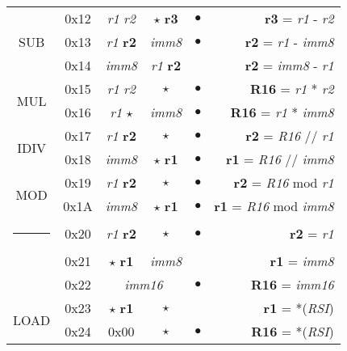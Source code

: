 \documentclass[a4paper,12pt]{article}
\makeatletter
\newcommand{\thickhline}{%
    \noalign {\ifnum 0=`}\fi \hrule height 2pt
    \futurelet \reserved@a \@xhline
}
\makeatother
\begin{document}
\begin{table}[H]
\begin{tabular}{|c|c|c|c|c|r|}
        \hline
        \multirow{3}{*}{SUB} & 0x12 & \textit{r1} \quad \textit{r2}  & $\star$ \quad \textbf{r3} & $\bullet$ & \textbf{r3} = \textit{r1} - \textit{r2}\\
        \cline{2-6}
                             & 0x13 & \textit{r1} \quad \textbf{r2}  & \textit{imm8} & $\bullet$ & \textbf{r2} = \textit{r1} - \textit{imm8}\\
        \cline{2-6}
                             & 0x14 & \textit{imm8} &  \textit{r1} \quad \textbf{r2} & & \textbf{r2} = \textit{imm8} - \textit{r1}\\
        \hline
        \multirow{2}{*}{MUL} & 0x15 & \textit{r1} \quad \textit{r2}  & $\star$ & $\bullet$ & \textbf{R16} = \textit{r1} * \textit{r2}\\
        \cline{2-6}
                             & 0x16 & \textit{r1} \quad $\star$  & \textit{imm8} & $\bullet$ & \textbf{R16} = \textit{r1} * \textit{imm8}\\
        \hline
        \multirow{2}{*}{IDIV}& 0x17 & \textit{r1} \quad \textbf{r2}  & $\star$ & $\bullet$ & \textbf{r2} = \textit{R16} // \textit{r1}\\
        \cline{2-6}
                             & 0x18 & \textit{imm8} & $\star$ \quad \textbf{r1} & $\bullet$ & \textbf{r1} = \textit{R16} // \textit{imm8}\\
        \hline
        \multirow{2}{*}{MOD} & 0x19 & \textit{r1} \quad \textbf{r2}  & $\star$ & $\bullet$ & \textbf{r2} = \textit{R16} mod \textit{r1}\\
        \cline{2-6}
                             & 0x1A & \textit{imm8} & $\star$ \quad \textbf{r1} & $\bullet$ & \textbf{r1} = \textit{R16} mod \textit{imm8}\\
        \thickhline
        \multirow{3}{*}{MOV} & 0x20 & \textit{r1} \quad \textbf{r2} & $\star$ & $\bullet$ & \textbf{r2} = \textit{r1}\\
        \cline{2-6}
                             & 0x21 & $\star$ \quad \textbf{r1} & \textit{imm8} & & \textbf{r1} = \textit{imm8}\\
        \cline{2-6}
                             & 0x22 & \multicolumn{2}{c|}{\textit{imm16}} & $\bullet$ & \textbf{R16} = \textit{imm16} \\
        \hline
        \multirow{2}{*}{LOAD} & 0x23 & $\star$ \quad \textbf{r1} & $\star$ & & \textbf{r1} = *(\textit{RSI})\\
        \cline{2-6}
                             & 0x24 & 0x00 & $\star$ & $\bullet$ & \textbf{R16} = *(\textit{RSI})\\

\end{tabular}
\end{table}
\end{document}
